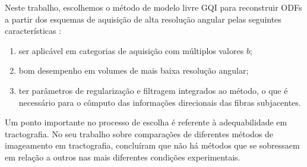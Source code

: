 \documentclass[
    12pt,                %
    oneside,            %
    a4paper,            %
    english,            %
    french,                %
    spanish,            %
    brazil                %
    ]{abntex2}
\begin{document}
Neste trabalho, escolhemos o método de modelo livre GQI para reconstruir ODFs a partir dos esquemas de aquisição de alta resolução angular pelas seguintes características \cite{yeh2010}:

\begin{enumerate}
    \item ser aplicável em categorias de aquisição com múltiplos valores $b$;
    \item bom desempenho em volumes de mais baixa resolução angular;
    \item ter parâmetros de regularização e filtragem integrados ao método, o que é necessário para o cômputo das informações direcionais das fibras subjacentes.
\end{enumerate}

Um ponto importante no processo de escolha é referente à adequabilidade em tractografia. No seu trabalho sobre comparações de diferentes métodos de imageamento em tractografia,  concluíram que não há métodos que se sobressaem em relação a outros nas mais diferentes condições experimentais.

























\end{document}
